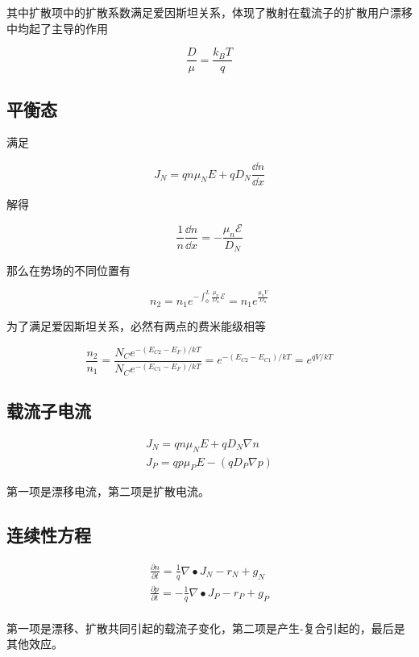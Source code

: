 \documentclass[cn,11pt,chinese,black,simple]{../elegantbook}
\begin{document}
其中扩散项中的扩散系数满足爱因斯坦关系，体现了散射在载流子的扩散用户漂移中均起了主导的作用

\[\dfrac{D}{\mu} = \dfrac{k_B T}{q}\]

\subsection{平衡态}

满足

\[J _{N}=q n \mu_{N} E+q D_{N} \dfrac{\dd{n}}{\dd{x}} \]

解得 

\[\frac{1}{n} \frac{\dd{n}}{\dd{x}} = - \frac{\mu_n \mathscr{E}}{D_N}\]

那么在势场的不同位置有

\[n_{2}=n_{1} e^{-\int_{0}^{L} \frac{\mu_{n}}{D_{n}} \mathscr{E}}{=n_{1} e^{\frac{\mu_{n} V}{D_{n}}}}\]

为了满足爱因斯坦关系，必然有两点的费米能级相等

\[\frac{n_{2}}{n_{1}}=\frac{N_{C} e^{-\left(E_{C 2}-E_{F}\right) / k T}}{N_{C} e^{-\left(E_{C 1}-E_{F}\right) / k T}}=e^{-\left(E_{C 2}-E_{C 1}\right) / k T}=e^{q V / k T}\]

\subsection{载流子电流}

\begin{equation*}
    \begin{array}{l}
        J _{N}=q n \mu_{N} E+q D_{N} \nabla n \\
        J _{P}=q p \mu_{P} E-\left(q D_{P} \nabla p\right) 
    \end{array}
\end{equation*}

第一项是漂移电流，第二项是扩散电流。

\subsection{连续性方程}


\[\begin{array}{l}
    \frac{\partial n}{\partial t}=\frac{1}{q} \nabla \bullet J _{N}-r_{N}+g_{N} \\
    \frac{\partial p}{\partial t}=-\frac{1}{q} \nabla \bullet J _{P}-r_{P}+g_{P} \\
\end{array}\]

第一项是漂移、扩散共同引起的载流子变化，第二项是产生-复合引起的，最后是其他效应。



\ifx\mainclass\undefined
\end{document}
